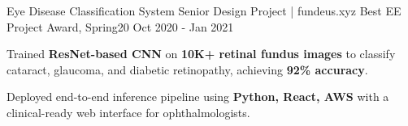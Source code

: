 \begin{cventries}
\cvopenentry
    {Eye Disease Classification System}
    {Senior Design Project | fundeus.xyz}
    {Best EE Project Award, Spring20}
    {Oct 2020 - Jan 2021}
    {
    \begin{cvitems}
      \item {Trained \textbf{ResNet-based CNN} on \textbf{10K+ retinal fundus images} to classify cataract, glaucoma, and diabetic retinopathy, achieving \textbf{92\% accuracy}.}
      \item {Deployed end-to-end inference pipeline using \textbf{Python, React, AWS} with a clinical-ready web interface for ophthalmologists.}
    \end{cvitems}
    }
\end{cventries}
